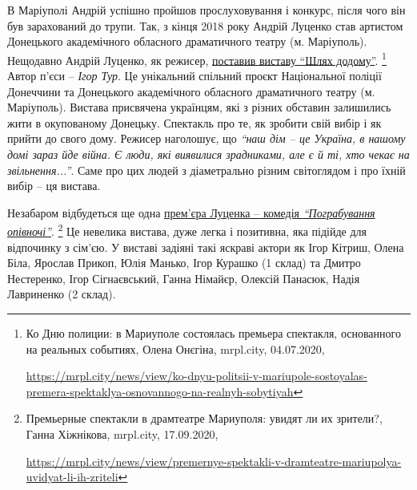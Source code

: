 В Маріуполі Андрій успішно пройшов прослуховування і конкурс, після чого він
був зарахований до трупи. Так, з кінця 2018 року Андрій Луценко став артистом
Донецького академічного обласного драматичного театру (м. Маріуполь). Нещодавно
Андрій Луценко, як режисер, \href{https://mrpl.city/news/view/ko-dnyu-politsii-v-mariupole-sostoyalas-premera-spektaklya-osnovannogo-na-realnyh-sobytiyah}{поставив виставу \enquote{Шлях додому}}.%
\footnote{Ко Дню полиции: в Мариуполе состоялась премьера спектакля, основанного на реальных событиях, Олена Онєгіна, mrpl.city, 04.07.2020, \par%
\url{https://mrpl.city/news/view/ko-dnyu-politsii-v-mariupole-sostoyalas-premera-spektaklya-osnovannogo-na-realnyh-sobytiyah}
}
Автор п'єси  – \emph{Ігор Тур}. Це унікальний спільний проєкт Національної поліції Донеччини та Донецького
академічного обласного драматичного театру (м. Маріуполь). Вистава присвячена
українцям, які з різних обставин залишились жити в окупованому Донецьку.
Спектакль про те, як зробити свій вибір і як прийти до свого дому. Режисер
наголошує, що \emph{\enquote{наш дім – це Україна, в нашому домі зараз йде війна. Є люди, які
виявилися зрадниками, але є й ті, хто чекає на звільнення...}}. Саме про цих
людей з діаметрально різним світоглядом і про їхній вибір – ця вистава.


Незабаром відбудеться ще одна \href{https://mrpl.city/news/view/premernye-spektakli-v-dramteatre-mariupolya-uvidyat-li-ih-zriteli}{%
прем'єра Луценка – комедія \emph{\enquote{Пограбування
опівночі}}}.%
\footnote{Премьерные спектакли в драмтеатре Мариуполя: увидят ли их зрители?, Ганна Хіжнікова, mrpl.city, 17.09.2020, \par%
\url{https://mrpl.city/news/view/premernye-spektakli-v-dramteatre-mariupolya-uvidyat-li-ih-zriteli}
} Це невелика вистава, дуже легка і позитивна, яка підійде для
відпочинку з сім'єю. У виставі задіяні такі яскраві актори як Ігор Кітриш,
Олена Біла, Ярослав Прикоп, Юлія Манько, Ігор Курашко (1 склад) та Дмитро
Нестеренко, Ігор Сігнаєвський, Ганна Німайєр, Олексій Панасюк, Надія Лавриненко
(2 склад).

